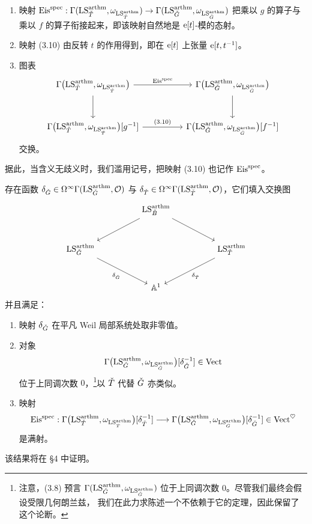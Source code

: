 \begin{lem}
\begin{enumerate}[label=(\arabic*), leftmargin=2.2em]
\item 映射 $\mathrm{Eis}^{\mathrm{spec}}:\Gamma(\mathrm{LS}^{\mathrm{arthm}}_{\check{T}},\omega_{\mathrm{LS}^{\mathrm{arthm}}_{\check{T}}})\to\Gamma(\mathrm{LS}^{\mathrm{arthm}}_{\check{G}},\omega_{\mathrm{LS}^{\mathrm{arthm}}_{\check{G}}})$
把乘以 $g$ 的算子与乘以 $f$ 的算子衔接起来，即该映射自然地是 $\mathrm{e}[t]$-模的态射。
\item 映射 (3.10) 由反转 $t$ 的作用得到，即在 $\mathrm{e}[t]$ 上张量 $\mathrm{e}[t,t^{-1}]$。
\item 图表
\[
\begin{tikzcd}[column sep=huge, row sep=large]
  \Gamma\bigl(\LS^{\arthm}_{\bT},\omega_{\LS^{\arthm}_{\bT}}\bigr)
    \arrow[r, "\Eisspec"] \arrow[d]
  & \Gamma\bigl(\LS^{\arthm}_{\bG},\omega_{\LS^{\arthm}_{\bG}}\bigr) \arrow[d] \\
  \Gamma\bigl(\LS^{\arthm}_{\bT},\omega_{\LS^{\arthm}_{\bT}}\bigr)[g^{-1}]
    \arrow[r, "(3.10)"]
  & \Gamma\bigl(\LS^{\arthm}_{\bG},\omega_{\LS^{\arthm}_{\bG}}\bigr)[f^{-1}]
\end{tikzcd}
\]
交换。
\end{enumerate}
\end{lem}

据此，当含义无歧义时，我们滥用记号，把映射 (3.10) 也记作 $\mathrm{Eis}^{\mathrm{spec}}$。


\begin{thm}
存在函数 $\delta_{\check{G}}\in\Omega^{\infty}\Gamma(\mathrm{LS}^{\mathrm{arthm}}_{\check{G}},\mathcal{O})$ 与
$\delta_{\check{T}}\in\Omega^{\infty}\Gamma(\mathrm{LS}^{\mathrm{arthm}}_{\check{T}},\mathcal{O})$，它们填入交换图
\begin{equation}
\begin{tikzcd}[column sep=huge, row sep=large]
  & \LS^{\arthm}_{\bB} \arrow[dl] \arrow[dr] & \\
  \LS^{\arthm}_{\bG} \arrow[dr, "\delta_{\bG}"'] & & \LS^{\arthm}_{\bT} \arrow[dl, "\delta_{\bT}"] \\
  & \A^1 &
\end{tikzcd}
\end{equation}
并且满足：
\begin{enumerate}[label=(\arabic*), leftmargin=2.2em]
\item 映射 $\delta_{\check{G}}$ 在平凡 Weil 局部系统处取非零值。
\item 对象
\[
  \Gamma\bigl(\mathrm{LS}^{\mathrm{arthm}}_{\check{G}},\omega_{\mathrm{LS}^{\mathrm{arthm}}_{\check{G}}}\bigr)[\delta_{\check{G}}^{-1}]\in\mathrm{Vect}
\]
位于上同调次数 $0$，\footnote{注意，(3.8) 预言
$\Gamma(\mathrm{LS}^{\mathrm{arthm}}_{\check{G}},\omega_{\mathrm{LS}^{\mathrm{arthm}}_{\check{G}}})$ 位于上同调次数 $0$。尽管我们最终会假设受限几何朗兰兹，
我们在此力求陈述一个不依赖于它的定理，因此保留了这个论断。}以 $\check{T}$ 代替 $\check{G}$ 亦类似。
\item 映射
\begin{equation}
  \mathrm{Eis}^{\mathrm{spec}}:\Gamma\bigl(\mathrm{LS}^{\mathrm{arthm}}_{\check{T}},\omega_{\mathrm{LS}^{\mathrm{arthm}}_{\check{T}}}\bigr)[\delta_{\check{T}}^{-1}]
  \longrightarrow
  \Gamma\bigl(\mathrm{LS}^{\mathrm{arthm}}_{\check{G}},\omega_{\mathrm{LS}^{\mathrm{arthm}}_{\check{G}}}\bigr)[\delta_{\check{G}}^{-1}]
  \in\mathrm{Vect}^{\heartsuit}
\end{equation}
是满射。
\end{enumerate}
\end{thm}

该结果将在 §4 中证明。
